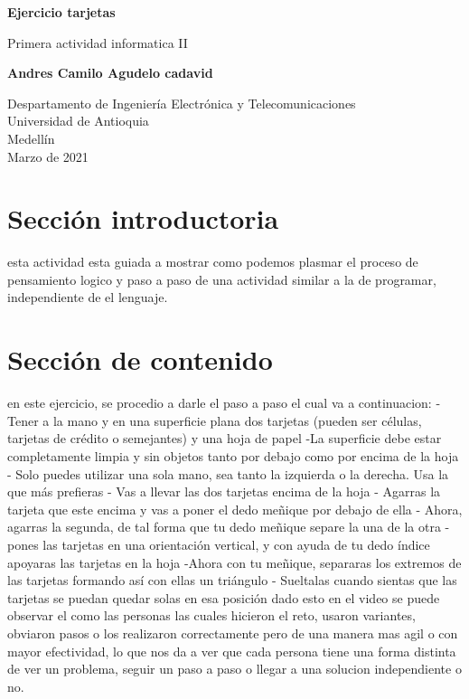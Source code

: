 \documentclass{article}
\begin{document}
\begin{titlepage}
    \begin{center}
        \vspace*{1cm}
            
        \Huge
        \textbf{Ejercicio tarjetas}
            
        \vspace{0.5cm}
        \LARGE
        Primera actividad informatica II
            
        \vspace{1.5cm}
            
        \textbf{Andres Camilo Agudelo cadavid }
            
        \vfill
            
        \vspace{0.8cm}
            
        \Large
        Despartamento de Ingeniería Electrónica y Telecomunicaciones\\
        Universidad de Antioquia\\
        Medellín\\
        Marzo de 2021
            
    \end{center}
\end{titlepage}

\tableofcontents
\newpage
\section{Sección introductoria}\label{intro}
esta actividad esta guiada a mostrar como podemos plasmar el proceso de pensamiento logico y paso a paso de una actividad similar a la de programar, independiente de el lenguaje.

\section{Sección de contenido} \label{contenido}
en este ejercicio, se procedio a darle el paso a paso el cual va a continuacion:
-Tener a la mano y en una superficie plana dos tarjetas (pueden ser células, tarjetas de crédito o semejantes) y una hoja de papel 
-La superficie debe estar completamente limpia y sin objetos tanto por debajo como por encima de la hoja
- Solo puedes utilizar una sola mano, sea tanto la izquierda o la derecha. Usa la que más prefieras
- Vas a llevar las dos tarjetas encima de la hoja 
- Agarras la tarjeta que este encima y vas a poner el dedo meñique por debajo de ella
- Ahora, agarras la segunda, de tal forma que tu dedo meñique separe la una de la otra
- pones las tarjetas en una orientación vertical, y con ayuda de tu dedo índice apoyaras las tarjetas en la hoja
-Ahora con tu meñique, separaras los extremos de las tarjetas formando así con ellas un triángulo 
- Sueltalas cuando sientas que las tarjetas se puedan quedar solas en esa posición
dado esto en el video se puede observar el como las personas las cuales hicieron el reto, usaron variantes, obviaron pasos o los realizaron correctamente pero de una manera mas agil o con mayor efectividad, lo que nos da a ver que cada persona tiene una forma distinta de ver un problema, seguir un paso a paso o llegar a una solucion independiente o no.
\end{document}

